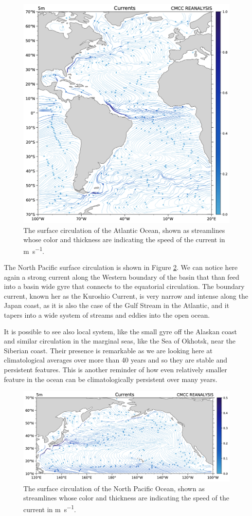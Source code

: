 \begin{figure}
	\centering
	\includegraphics[width = 0.4 \textwidth]{figs/surface-circulation-atlantic-ocean}
	\caption{The surface circulation of the Atlantic Ocean, shown as streamlines whose color and thickness are indicating the speed of the current in \unit{\meter \per\second}.}
	\label{fig:surface-circulation-atlantic-ocean}
\end{figure}

The North Pacific surface circulation is shown in Figure \ref{fig:surface-circulation-north-pacific-ocean}. We can notice here again a strong current along the Western boundary of the basin that than feed into a basin wide gyre that connects to the equatorial circulation. The boundary current, known her as the Kuroshio Current, is very narrow and intense along the Japan coast, as it is also the case of the Gulf Stream in the Atlantic, and it tapers into a wide system of streams and eddies into the open ocean.

It is possible to see also local system, like the small gyre off the Alaskan coast and similar circulation in the marginal seas, like the Sea of Okhotsk, near the Siberian coast. Their presence is remarkable as we are looking here at climatological averages over more than 40 years and so they are stable and persistent features. This is another reminder of how even relatively smaller feature in the ocean can be climatologically persistent over many years.

\begin{figure}
	\centering
	\includegraphics[width = 0.4 \textwidth]{figs/surface-circulation-north-pacific-ocean}
	\caption{The surface circulation of the North Pacific Ocean, shown as streamlines whose color and thickness are indicating
		the speed of the current in \unit{\meter \per\second}.}
	\label{fig:surface-circulation-north-pacific-ocean}
\end{figure}

